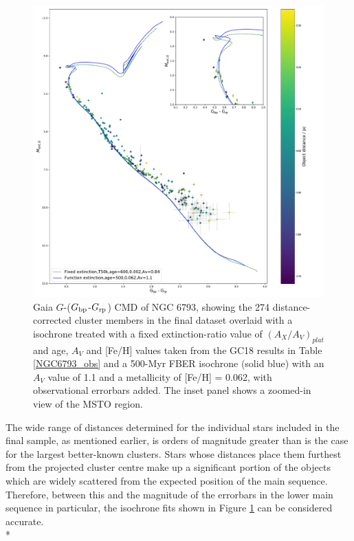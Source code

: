\documentclass[12pt, a4paper]{report}
\begin{document}
\begin{figure}[h!]
\begin{center}
\includegraphics[width=1.0\textwidth]{../NGC_6793_CMD_FeH_0p062_Av_1p1_500Myr_vizier_isochrones_summary_errorbars.pdf}
\caption{Gaia $G$-($G_{\textnormal{bp}}$-$G_{\textnormal{rp}}$) CMD of NGC 6793, showing the 274 distance-corrected cluster members in the final dataset overlaid with a isochrone treated with a fixed extinction-ratio value of $(A_{X}/A_{V})_{plat}$ and age, $A_{V}$ and [Fe/H] values taken from the GC18 results in Table \ref{NGC6793_obs} and a 500-Myr FBER isochrone (solid blue) with an $A_{V}$ value of 1.1 and a metallicity of [Fe/H] = 0.062, with observational errorbars added. The inset panel shows a zoomed-in view of the MSTO region.}
\label{NGC_6793_isoc_inset_1.1_500_0.062}
\end{center}
\end{figure}

The wide range of distances determined for the individual stars included in the final sample, as mentioned earlier, is orders of magnitude greater than is the case for the largest better-known clusters. Stars whose distances place them furthest from the projected cluster centre make up a significant portion of the objects which are widely scattered from the expected position of the main sequence. Therefore, between this and the magnitude of the errorbars in the lower main sequence in particular, the isochrone fits shown in Figure \ref{NGC_6793_isoc_inset_1.1_500_0.062} can be considered accurate. \\*
\end{document}
